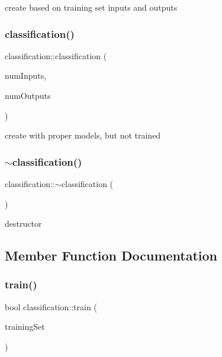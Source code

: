 create based on training set inputs and outputs \mbox{\label{classclassification_ab50d95013f5266aa5cc4595f69e62c71}} 
\subsubsection{\texorpdfstring{classification()}{classification()}\hspace{0.1cm}{\footnotesize\ttfamily [3/3]}}
{\footnotesize\ttfamily classification\+::classification (\begin{DoxyParamCaption}\item[{const int \&}]{num\+Inputs,  }\item[{const int \&}]{num\+Outputs }\end{DoxyParamCaption})}

create with proper models, but not trained \mbox{\label{classclassification_ac65a474682b7c3b8661585de8b8f8f8b}} 
\subsubsection{\texorpdfstring{$\sim$classification()}{~classification()}}
{\footnotesize\ttfamily classification\+::$\sim$classification (\begin{DoxyParamCaption}{ }\end{DoxyParamCaption})\hspace{0.3cm}{\ttfamily [inline]}}

destructor 

\subsection{Member Function Documentation}
\mbox{\label{classclassification_ac7f8a3ad1a0f4f466cd6f5ed041615d9}} 
\subsubsection{\texorpdfstring{train()}{train()}}
{\footnotesize\ttfamily bool classification\+::train (\begin{DoxyParamCaption}\item[{const std\+::vector$<$ \hyperlink{structtraining_example}{training\+Example} $>$ \&}]{training\+Set }\end{DoxyParamCaption})\hspace{0.3cm}{\ttfamily [virtual]}}

